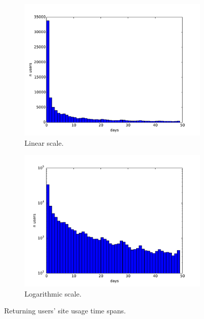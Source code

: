 \begin{figure}[t]
  \centering
  \begin{subfigure}[t]{0.9\textwidth}
    \includegraphics[width=\textwidth]{Figures/plots/timediffs/timediffs}
    \caption{Linear scale.}
  \end{subfigure}

  \begin{subfigure}[t]{0.9\textwidth}
    \includegraphics[width=\textwidth]{Figures/plots/timediffs/timediffs-log}
    \caption{Logarithmic scale.}
  \end{subfigure}

  \caption{Returning users' site usage time spans.}
  \label{fig:user_timediffs}
\end{figure}

